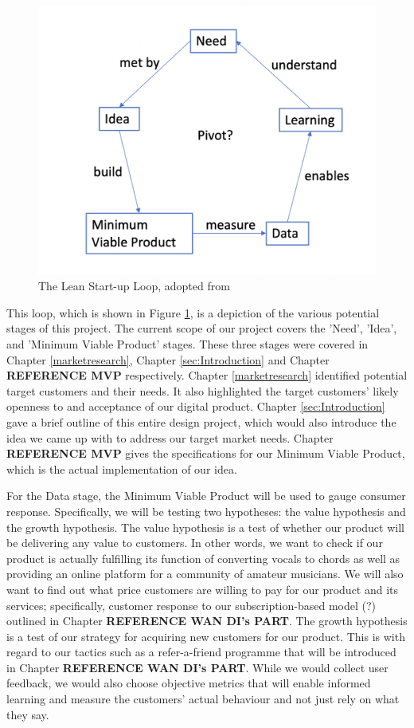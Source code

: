 \begin{figure}
    \centering
    \includegraphics[scale=0.4]{Figures/Lean Startup loop}
    \decoRule
    \caption{The Lean Start-up Loop, adopted from \protect\cite{leanstartuploop}}
    \label{fig:leanloop}
    \end{figure}
    

This loop, which is shown in Figure \ref{fig:leanloop}, is a depiction of the various potential stages of this project. The current scope of our project covers the 'Need', 'Idea', and 'Minimum Viable Product' stages. These three stages were covered in Chapter \ref{marketresearch}, Chapter \ref{sec:Introduction} and Chapter \textbf{REFERENCE MVP} respectively. Chapter \ref{marketresearch} identified potential target customers and their needs. It also highlighted the target customers' likely openness to and acceptance of our digital product. Chapter \ref{sec:Introduction} gave a brief outline of this entire design project, which would also introduce the idea we came up with to address our target market needs. Chapter \textbf{REFERENCE MVP} gives the specifications for our Minimum Viable Product, which is the actual implementation of our idea. 

For the Data stage, the Minimum Viable Product will be used to gauge consumer response. Specifically, we will be testing two hypotheses: the value hypothesis and the growth hypothesis. The value hypothesis is a test of whether our product will be delivering any value to customers. In other words, we want to check if our product is actually fulfilling its function of converting vocals to chords as well as providing an online platform for a community of amateur musicians. We will also want to find out what price customers are willing to pay for our product and its services; specifically, customer response to our subscription-based model (?) outlined in Chapter \textbf{REFERENCE WAN DI's PART}.  The growth hypothesis is a test of our strategy for acquiring new customers for our product. This is with regard to our tactics such as a refer-a-friend programme that will be introduced in Chapter \textbf{REFERENCE WAN DI's PART}. While we would collect user feedback, we would also choose objective metrics that will enable informed learning and measure the customers' actual behaviour and not just rely on what they say.

